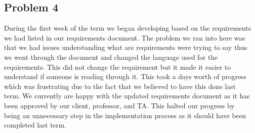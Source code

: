 \documentclass[draftclsnofoot,10pt,onecolumn]{IEEEtran} %
\begin{document}
\begin{enumerate}
\subsection{Problem 4}
During the first week of the term we began developing based on the requirements
we had listed in our requirements document. The problem we ran into here was
that we had issues understanding what are requirements were trying to say thus
we went through the document and changed the language used for the requirements.
This did not change the requirement but it made it easier to understand if
someone is reading through it. This took a days worth of progress which was
frustrating due to the fact that we believed to have this done last term. We
currently are happy with the updated requirements document as it has been
approved by our client, professor, and TA. This halted our progress by being an
unnecessary step in the implementation process as it should have been completed
last term.

\end{enumerate}
\end{document}
